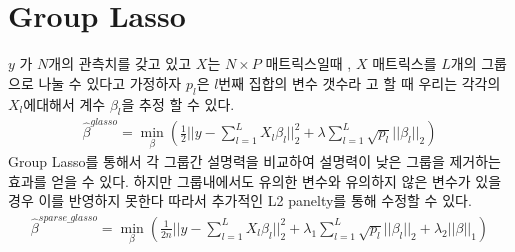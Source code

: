 \documentclass[11pt]{article}
\begin{document}
\section{Group Lasso}
$y$ 가 $N$개의 관측치를 갖고 있고 $X$는 $N \times P$ 매트릭스일때 , $X$ 매트릭스를 $L$개의 그룹으로 나눌 수 있다고 가정하자 $p_{l}$은 $l$번째 집합의 변수 갯수라 고 할 때 우리는 각각의 $X_{l}$에대해서 계수 $\beta_{l}$을 추정 할 수 있다.
  \begin{align}
\hat{\beta}^{glasso} = \min_{\beta}( \frac{1}{2}||y - \sum\limits_{l=1}^L X_{l}\beta_{l}||_{2}^2 + \lambda \sum\limits_{l=1}^L \sqrt{p_{l}}||\beta_{l}||_{2})
  \end{align}
Group Lasso를 통해서 각 그룹간 설명력을 비교하여 설명력이 낮은 그룹을 제거하는 효과를 얻을 수 있다. 하지만 그룹내에서도 유의한 변수와 유의하지 않은 변수가 있을 경우 이를 반영하지 못한다 따라서 추가적인 L2 panelty를 통해 수정할 수 있다.
  \begin{align}
\hat{\beta}^{sparse\_glasso} = \min_{\beta}(\frac{1}{2n} ||y - \sum\limits_{l=1}^L X_{l}\beta_{l}||_{2}^2 + \lambda_{1} \sum\limits_{l=1}^L \sqrt{p_{l}}||\beta_{l}||_{2} + \lambda_{2}||\beta||_{1})
  \end{align}
\end{document}

